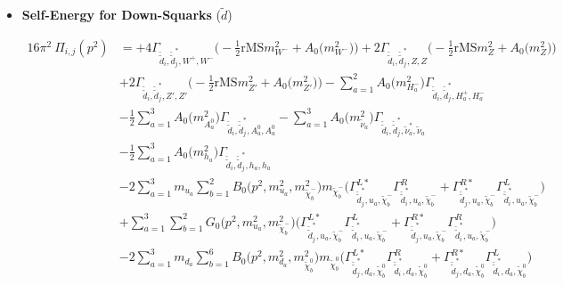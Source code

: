 \begin{itemize} 
\item {\bf Self-Energy for Down-Squarks} \thickspace (\(\tilde{d}\)) 

\begin{align} 
16\pi^2 \ \Pi_{i,j}(p^2) &= +4 {\Gamma_{\check{\tilde{d}}_{{i}},\check{\tilde{d}}^*_{{j}},W^+,W^-}} \Big(-\frac{1}{2} \text{rMS} m^2_{W^-}  + {A_0\Big(m^2_{W^-}\Big)}\Big)+2 {\Gamma_{\check{\tilde{d}}_{{i}},\check{\tilde{d}}^*_{{j}},Z,Z}} \Big(-\frac{1}{2} \text{rMS} m^2_{Z}  + {A_0\Big(m^2_{Z}\Big)}\Big)\nonumber \\ 
 &+2 {\Gamma_{\check{\tilde{d}}_{{i}},\check{\tilde{d}}^*_{{j}},{Z'},{Z'}}} \Big(-\frac{1}{2} \text{rMS} m^2_{{Z'}}  + {A_0\Big(m^2_{{Z'}}\Big)}\Big)- \sum_{a=1}^{2}{A_0\Big(m^2_{H^-_{{a}}}\Big)} {\Gamma_{\check{\tilde{d}}_{{i}},\check{\tilde{d}}^*_{{j}},H^+_{{a}},H^-_{{a}}}}  \nonumber \\ 
 &-\frac{1}{2} \sum_{a=1}^{3}{A_0\Big(m^2_{A^0_{{a}}}\Big)} {\Gamma_{\check{\tilde{d}}_{{i}},\check{\tilde{d}}^*_{{j}},A^0_{{a}},A^0_{{a}}}}  - \sum_{a=1}^{3}{A_0\Big(m^2_{\tilde{\nu}_{{a}}}\Big)} {\Gamma_{\check{\tilde{d}}_{{i}},\check{\tilde{d}}^*_{{j}},\tilde{\nu}^*_{{a}},\tilde{\nu}_{{a}}}}  \nonumber \\ 
 &-\frac{1}{2} \sum_{a=1}^{3}{A_0\Big(m^2_{h_{{a}}}\Big)} {\Gamma_{\check{\tilde{d}}_{{i}},\check{\tilde{d}}^*_{{j}},h_{{a}},h_{{a}}}}  \nonumber \\ 
 &-2 \sum_{a=1}^{3}m_{u_{{a}}} \sum_{b=1}^{2}{B_0\Big(p^{2},m^2_{u_{{a}}},m^2_{\tilde{\chi}^-_{{b}}}\Big)} m_{\tilde{\chi}^-_{{b}}} \Big({\Gamma^{L*}_{\check{\tilde{d}}^*_{{j}},u_{{a}},\tilde{\chi}^-_{{b}}}} {\Gamma^R_{\check{\tilde{d}}^*_{{i}},u_{{a}},\tilde{\chi}^-_{{b}}}}  + {\Gamma^{R*}_{\check{\tilde{d}}^*_{{j}},u_{{a}},\tilde{\chi}^-_{{b}}}} {\Gamma^L_{\check{\tilde{d}}^*_{{i}},u_{{a}},\tilde{\chi}^-_{{b}}}} \Big)  \nonumber \\ 
 &+\sum_{a=1}^{3}\sum_{b=1}^{2}{G_0\Big(p^{2},m^2_{u_{{a}}},m^2_{\tilde{\chi}^-_{{b}}}\Big)} \Big({\Gamma^{L*}_{\check{\tilde{d}}^*_{{j}},u_{{a}},\tilde{\chi}^-_{{b}}}} {\Gamma^L_{\check{\tilde{d}}^*_{{i}},u_{{a}},\tilde{\chi}^-_{{b}}}}  + {\Gamma^{R*}_{\check{\tilde{d}}^*_{{j}},u_{{a}},\tilde{\chi}^-_{{b}}}} {\Gamma^R_{\check{\tilde{d}}^*_{{i}},u_{{a}},\tilde{\chi}^-_{{b}}}} \Big)\nonumber \\ 
 &-2 \sum_{a=1}^{3}m_{d_{{a}}} \sum_{b=1}^{6}{B_0\Big(p^{2},m^2_{d_{{a}}},m^2_{\tilde{\chi}^0_{{b}}}\Big)} m_{\tilde{\chi}^0_{{b}}} \Big({\Gamma^{L*}_{\check{\tilde{d}}^*_{{j}},d_{{a}},\tilde{\chi}^0_{{b}}}} {\Gamma^R_{\check{\tilde{d}}^*_{{i}},d_{{a}},\tilde{\chi}^0_{{b}}}}  + {\Gamma^{R*}_{\check{\tilde{d}}^*_{{j}},d_{{a}},\tilde{\chi}^0_{{b}}}} {\Gamma^L_{\check{\tilde{d}}^*_{{i}},d_{{a}},\tilde{\chi}^0_{{b}}}} \Big)  \nonumber \\ 

\end{align}
\end{itemize}
